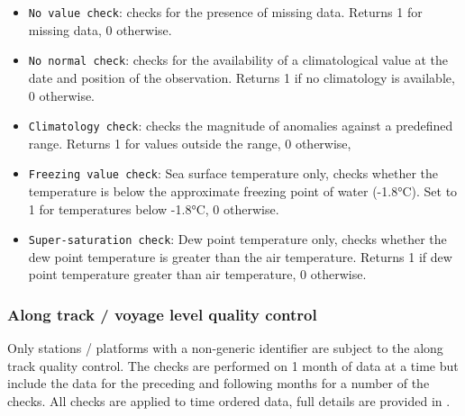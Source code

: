 \begin{itemize}[resume]
\item \texttt{No value check}: checks for the presence of missing data. Returns 1 for missing data, 0 otherwise.
\item \texttt{No normal check}: checks for the availability of a climatological value at the date and position of the observation. Returns 1 if no climatology is available, 0 otherwise.
\item \texttt{Climatology check}: checks the magnitude of anomalies against a predefined range. Returns 1 for values outside the range, 0 otherwise,
\item \texttt{Freezing value check}: Sea surface temperature only, checks whether the temperature is below the approximate freezing point of water (-1.8°C). Set to 1 for temperatures below -1.8°C, 0 otherwise. 
\item \texttt{Super-saturation check}: Dew point temperature only, checks whether the dew point temperature is greater than the air temperature. Returns 1 if dew point temperature greater than air temperature, 0 otherwise.
\end{itemize}

\FloatBarrier
\subsubsection{Along track / voyage level quality control} \label{track-qc}
Only stations / platforms with a non-generic identifier are subject to the along track quality control. The checks are performed on 1 month of data at a time but include the data for the preceding and following months for a number of the checks. All checks are applied to time ordered data, full details are provided in \cite{Kennedy2019}.

